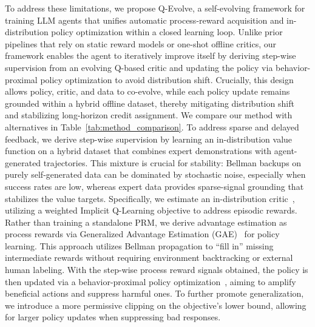 \documentclass{article}
\theoremstyle{plain}
\theoremstyle{definition}
\theoremstyle{remark}
\begin{document}
To address these limitations, we propose Q-Evolve, a self-evolving framework for training LLM agents that unifies automatic process-reward acquisition and in-distribution policy optimization within a closed learning loop.
Unlike prior pipelines that rely on static reward models or one-shot offline critics, our framework enables the agent to iteratively improve itself by deriving step-wise supervision from an evolving Q-based critic and updating the policy via behavior-proximal policy optimization to avoid distribution shift.
Crucially, this design allows policy, critic, and data to co-evolve, while each policy update remains grounded within a hybrid offline dataset, thereby mitigating distribution shift and stabilizing long-horizon credit assignment.
 We compare our method with alternatives in Table~\ref{tab:method_comparison}.
To address sparse and delayed feedback, we derive step-wise supervision by learning an in-distribution value function on a hybrid dataset that combines expert demonstrations with agent-generated trajectories. This mixture is crucial for stability: Bellman backups on purely self-generated data can be dominated by stochastic noise, especially when success rates are low, whereas expert data provides sparse-signal grounding that stabilizes the value targets.
Specifically, we estimate an in-distribution critic~\citep{kostrikov2022offline}, utilizing a weighted Implicit Q-Learning objective to address episodic rewards. 
Rather than training a standalone PRM, we derive advantage estimation as process rewards via Generalized Advantage Estimation (GAE)~\citep{gae} for policy learning. This approach utilizes Bellman propagation to ``fill in'' missing intermediate rewards without requiring environment backtracking or external human labeling.
With the step-wise process reward signals obtained, the policy is then updated via a behavior-proximal policy optimization~\citep{zhuang2023behavior}, aiming to amplify beneficial actions and suppress harmful ones. To further promote generalization, we introduce 
a more permissive clipping on the objective's lower bound, allowing for larger policy updates when suppressing bad responses.
\end{document}
